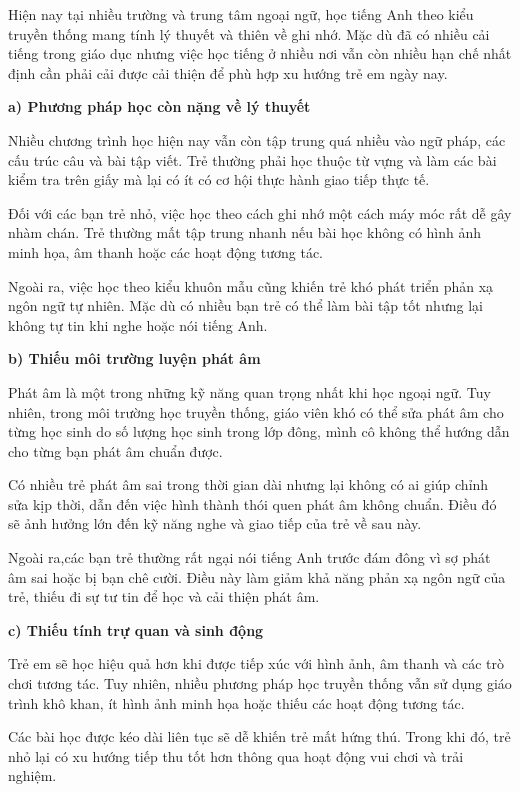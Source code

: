 Hiện nay tại nhiều trường và trung tâm ngoại ngữ, học tiếng Anh theo kiểu truyền thống mang tính lý thuyết và thiên về ghi nhớ. Mặc dù đã có nhiều cải tiếng trong giáo dục nhưng việc học tiếng ở nhiều nơi vẫn còn nhiều hạn chế nhất định cần phải cải được cải thiện để phù hợp xu hướng trẻ em ngày nay.


\noindent\textbf{a) Phương pháp học còn nặng về lý thuyết}


Nhiều chương trình học hiện nay vẫn còn tập trung quá nhiều vào ngữ pháp, các cấu trúc câu và bài tập viết. Trẻ thường phải học thuộc từ vựng và làm các bài kiểm tra trên giấy mà lại có ít có cơ hội thực hành giao tiếp thực tế.


Đối với các bạn trẻ nhỏ, việc học theo cách ghi nhớ một cách máy móc rất dễ gây nhàm chán. Trẻ thường mất tập trung nhanh nếu bài học không có hình ảnh minh họa, âm thanh hoặc các hoạt động tương tác.


Ngoài ra, việc học theo kiểu khuôn mẫu cũng khiến trẻ khó phát triển phản xạ ngôn ngữ tự nhiên. Mặc dù có nhiều bạn trẻ có thể làm bài tập tốt nhưng lại không tự tin khi nghe hoặc nói tiếng Anh.


\noindent\textbf{b) Thiếu môi trường luyện phát âm}


Phát âm là một trong những kỹ năng quan trọng nhất khi học ngoại ngữ. Tuy nhiên, trong môi trường học truyền thống, giáo viên khó có thể sửa phát âm cho từng học sinh do số lượng học sinh trong lớp đông, mình cô không thể hướng dẫn cho từng bạn phát âm chuẩn được.


Có nhiều trẻ phát âm sai trong thời gian dài nhưng lại không có ai giúp chỉnh sửa kịp thời, dẫn đến việc hình thành thói quen phát âm không chuẩn. Điều đó sẽ ảnh hưởng lớn đến kỹ năng nghe và giao tiếp của trẻ về sau này.


Ngoài ra,các bạn trẻ thường rất ngại nói tiếng Anh trước đám đông vì sợ phát âm sai hoặc bị bạn chê cười. Điều này làm giảm khả năng phản xạ ngôn ngữ của trẻ, thiếu đi sự tư tin để học và cải thiện phát âm.


\noindent\textbf{c) Thiếu tính trự quan và sinh động}


Trẻ em sẽ học hiệu quả hơn khi được tiếp xúc với hình ảnh, âm thanh và các trò chơi tương tác. Tuy nhiên, nhiều phương pháp học truyền thống vẫn sử dụng giáo trình khô khan, ít hình ảnh minh họa hoặc thiếu các hoạt động tương tác.


Các bài học được kéo dài liên tục sẽ dễ khiến trẻ mất hứng thú. Trong khi đó, trẻ nhỏ lại có xu hướng tiếp thu tốt hơn thông qua hoạt động vui chơi và trải nghiệm.


